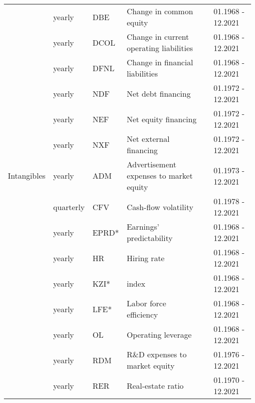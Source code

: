 \begin{landscape}
{\begin{ThreePartTable}
\begin{center}
\begin{footnotesize}
\begin{longtabu}{p{2.4cm} p{2cm} p{1.6cm} p{8.5cm} p{5.7cm} p{3.2cm}}
						& yearly & DBE & Change in common equity & \cite{ri/sl/so/tu/2005} & 01.1968 - 12.2021  \\
                        \rule{0pt}{1ex}
                        & yearly & DCOL & Change in current operating liabilities & \cite{ri/sl/so/tu/2005} & 01.1968 - 12.2021  \\
                        \rule{0pt}{1ex}
                        & yearly & DFNL & Change in financial liabilities & \cite{ri/sl/so/tu/2005} & 01.1968 - 12.2021  \\
                        \rule{0pt}{1ex}
					      & yearly & NDF & Net debt financing & \cite{br/ri/sl/2006} & 01.1972 - 12.2021  \\
                        \rule{0pt}{1ex}
					      & yearly & NEF & Net equity financing & \cite{br/ri/sl/2006} & 01.1972 - 12.2021  \\
                        \rule{0pt}{1ex}
					    & yearly & NXF & Net external financing & \cite{br/ri/sl/2006} & 01.1972 - 12.2021 \\
                        \hline
					    \rule{0pt}{2ex}
					    Intangibles & yearly & ADM & Advertisement expenses to market equity & \cite{ch/la/so/2001} & 01.1973 - 12.2021 \\ 
                        \rule{0pt}{1ex}
					    & quarterly & CFV & Cash-flow volatility & \cite{hu/2009} & 01.1978 - 12.2021 \\
                        \rule{0pt}{1ex}
						  & yearly & EPRD* & Earnings' predictability & \cite{fr/la/ol/sc/2004} & 01.1968 - 12.2021 \\
                        \rule{0pt}{1ex}
						  & yearly & HR & Hiring rate & \cite{be/li/ba/2014} & 01.1968 - 12.2021  \\
                        \rule{0pt}{1ex}
					    & yearly & KZI* & \cite{ka/zi/1997} index &  \cite{la/po/sa/2001} & 01.1968 - 12.2021 \\
                        \rule{0pt}{1ex}
						  & yearly & LFE* & Labor force efficiency & \cite{ab/bu/1998} & 01.1968 - 12.2021 \\
                        \rule{0pt}{1ex}
						  & yearly & OL & Operating leverage & \cite{no/2011} & 01.1968 - 12.2021  \\
                        \rule{0pt}{1ex}
						  & yearly & RDM & R\&D expenses to market equity & \cite{ch/la/so/2001} & 01.1976 - 12.2021  \\
                        \rule{0pt}{1ex}
						  & yearly & RER & Real-estate ratio & \cite{tu/2010} & 01.1970 - 12.2021 \\

\end{longtabu}
\end{footnotesize}
\end{center}
\end{ThreePartTable}}
\end{landscape}
